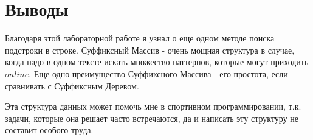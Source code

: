 \section{Выводы}

Благодаря этой лабораторной работе я узнал о еще одном методе поиска подстроки в строке.
Суффиксный Массив - очень мощная структура в случае, когда надо в одном тексте искать множество паттернов, которые могут приходить $online$. Еще одно преимущество Суффиксного Массива - его простота, если сравнивать с Суффиксным Деревом.

Эта структура данных может помочь мне в спортивном программировании, т.к. задачи, которые она решает часто встречаются, да и написать эту структуру не составит особого труда.

\pagebreak
